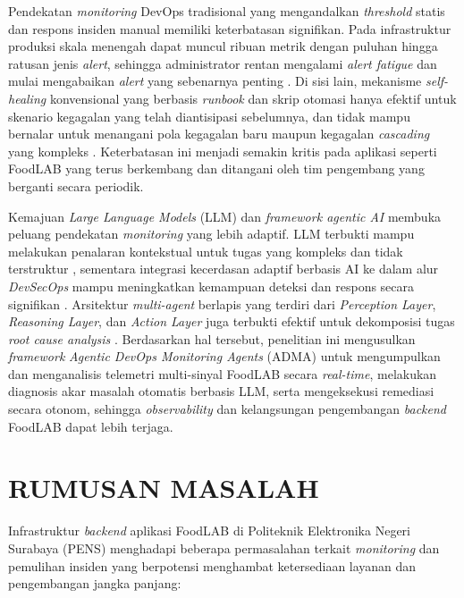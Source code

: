 Pendekatan \textit{monitoring} DevOps tradisional yang mengandalkan \textit{threshold} statis dan respons insiden manual memiliki keterbatasan signifikan. Pada infrastruktur produksi skala menengah dapat muncul ribuan metrik dengan puluhan hingga ratusan jenis \textit{alert}, sehingga administrator rentan mengalami \textit{alert fatigue} dan mulai mengabaikan \textit{alert} yang sebenarnya penting \cite{voutsas2024mitigating}. Di sisi lain, mekanisme \textit{self-healing} konvensional yang berbasis \textit{runbook} dan skrip otomasi hanya efektif untuk skenario kegagalan yang telah diantisipasi sebelumnya, dan tidak mampu bernalar untuk menangani pola kegagalan baru maupun kegagalan \textit{cascading} yang kompleks \cite{liang2023self}. Keterbatasan ini menjadi semakin kritis pada aplikasi seperti FoodLAB yang terus berkembang dan ditangani oleh tim pengembang yang berganti secara periodik.

Kemajuan \textit{Large Language Models} (LLM) dan \textit{framework agentic AI} membuka peluang pendekatan \textit{monitoring} yang lebih adaptif. LLM terbukti mampu melakukan penalaran kontekstual untuk tugas yang kompleks dan tidak terstruktur \cite{xu2025large}, sementara integrasi kecerdasan adaptif berbasis AI ke dalam alur \textit{DevSecOps} mampu meningkatkan kemampuan deteksi dan respons secara signifikan \cite{dinh2025enhancing}. Arsitektur \textit{multi-agent} berlapis yang terdiri dari \textit{Perception Layer}, \textit{Reasoning Layer}, dan \textit{Action Layer} juga terbukti efektif untuk dekomposisi tugas \textit{root cause analysis} \cite{fu2025leveraging}. Berdasarkan hal tersebut, penelitian ini mengusulkan \textit{framework} \textit{Agentic DevOps Monitoring Agents} (ADMA) untuk mengumpulkan dan menganalisis telemetri multi-sinyal FoodLAB secara \textit{real-time}, melakukan diagnosis akar masalah otomatis berbasis LLM, serta mengeksekusi remediasi secara otonom, sehingga \textit{observability} dan kelangsungan pengembangan \textit{backend} FoodLAB dapat lebih terjaga.

\section{RUMUSAN MASALAH}

Infrastruktur \textit{backend} aplikasi FoodLAB di Politeknik Elektronika Negeri Surabaya (PENS) menghadapi beberapa permasalahan terkait \textit{monitoring} dan pemulihan insiden yang berpotensi menghambat ketersediaan layanan dan pengembangan jangka panjang:


